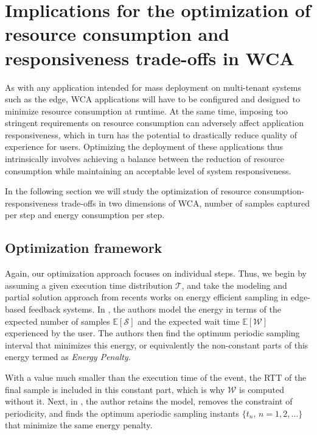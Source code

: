 \section{Implications for the optimization of resource consumption and responsiveness trade-offs in \ac{WCA}}\label{sec:implications:optimization}

As with any application intended for mass deployment on multi-tenant systems such as the edge, \ac{WCA} applications will have to be configured and designed to minimize resource consumption at runtime.
At the same time, imposing too stringent requirements on resource consumption can adversely affect application responsiveness, which in turn has the potential to drastically reduce quality of experience for users.
Optimizing the deployment of these applications thus intrinsically involves achieving a balance between the reduction of resource consumption while maintaining an acceptable level of system responsiveness.

In the following section we will study the optimization of resource consumption-responsiveness trade-offs in two dimensions of \ac{WCA}, number of samples captured per step and energy consumption per step.


\subsection{Optimization framework}

Again, our optimization approach focuses on individual steps.
Thus, we begin by assuming a given execution time distribution \( \mathcal{T} \), and take the modeling and partial solution approach from recents works on energy efficient sampling in edge-based feedback systems.
In \textcite{ICCperiodic1,TMCperiodic}, the authors model the energy in terms of the expected number of samples $\mathbb{E}[\mathcal{S}]$ and the expected wait time $\mathbb{E}[\mathcal{W}]$ experienced by the user.
The authors then find the optimum periodic sampling interval that minimizes this energy, or equivalently the non-constant parts of this energy termed as \textit{Energy Penalty}.

With a value much smaller than the execution time of the event, the \ac{RTT} of the final sample is included in this constant part, which is why $\mathcal{W}$ is computed without it.
Next, in \textcite{secAperiodic}, the author retains the model, removes the constraint of periodicity, and finds the optimum aperiodic sampling instants $\{t_n,\,n=1,2,\dots\}$ that minimize the same energy penalty.


